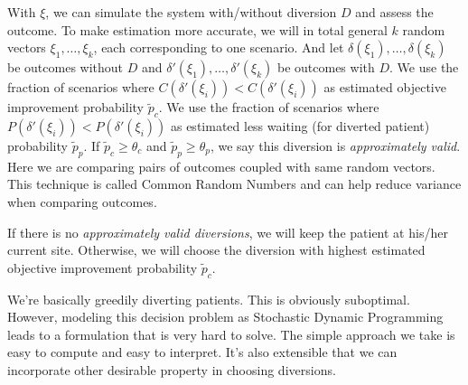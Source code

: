 With $\xi$, we can simulate the system with/without diversion $D$
and assess the outcome. To make estimation more accurate, we will
in total general $k$ random vectors $\xi_1, \ldots, \xi_k$, each
corresponding to one scenario. And let $\delta(\xi_1), \ldots,
\delta(\xi_k)$ be outcomes without $D$ and $\delta'(\xi_1), \ldots,
\delta'(\xi_k)$ be outcomes with $D$. We use the fraction of
scenarios where $C(\delta'(\xi_i)) < C(\delta'(\xi_i))$ as
estimated objective improvement probability $\tilde p_c$. We use the fraction
of scenarios where $P(\delta'(\xi_i)) < P(\delta'(\xi_i))$ as
estimated less waiting (for diverted patient) probability $\tilde p_p$.
If $\tilde p_c \ge \theta_c$ and $\tilde p_p \ge \theta_p$, we say
this diversion is \textit{approximately valid}. Here we are
comparing pairs of outcomes coupled with same random vectors.
This technique is called Common Random Numbers and can help
reduce variance when comparing outcomes.

If there is no \textit{approximately valid diversions}, we will
keep the patient at his/her current site. Otherwise, we will
choose the diversion with highest estimated objective improvement
probability $\tilde p_c$.

We're basically greedily diverting patients. This is obviously
suboptimal. However, modeling this decision problem as Stochastic
Dynamic Programming leads to a formulation that is very hard to
solve. The simple approach we take is easy to compute and easy
to interpret. It's also extensible that we can incorporate other
desirable property in choosing diversions.

